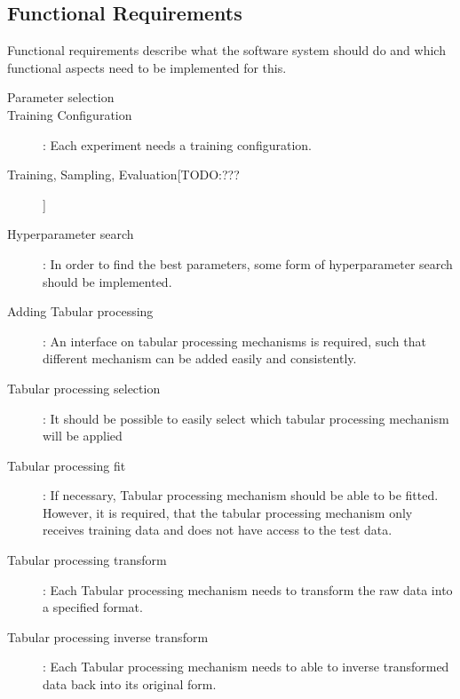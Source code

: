 \subsection*{Functional Requirements}
Functional requirements describe what the software system should do and which functional aspects need to be implemented for this.

\begin{description}
    \item[Parameter selection] 
    \item[Training Configuration]: %
    Each experiment needs a training configuration.

    \item[Training, Sampling, Evaluation[TODO:???]]  
    

    \item[Hyperparameter search]:
    In order to find the best parameters, some form of hyperparameter search should be implemented.

    \item[Adding Tabular processing]:
    An interface on tabular processing mechanisms is required, such that different mechanism can be added easily and consistently.
    
    \item[Tabular processing selection]:
    It should be possible to easily select which tabular processing mechanism will be applied

    \item[Tabular processing fit]:
    If necessary, Tabular processing mechanism should be able to be fitted.
    However, it is required, that the tabular processing mechanism only receives training data and does not have access to the test data.

    \item[Tabular processing transform]:
    Each Tabular processing mechanism needs to transform the raw data into a specified format.

    \item[Tabular processing inverse transform]:
    Each Tabular processing mechanism needs to able to inverse transformed data back into its original form.

\end{description}





